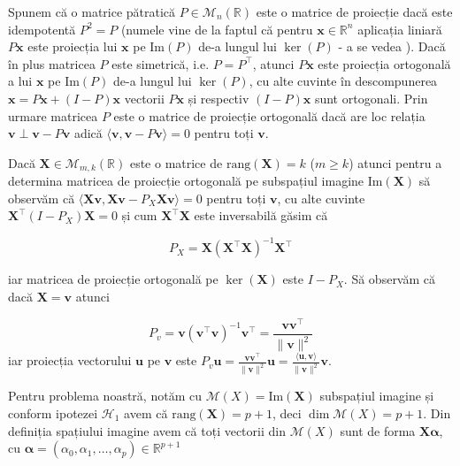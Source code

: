 \documentclass[]{article}
\begin{document}
Spunem că o matrice pătratică \(P\in\mathcal{M}_{n}(\mathbb{R})\) este o
matrice de proiecție dacă este idempotentă \(P^2 = P\) (numele vine de
la faptul că pentru \(\boldsymbol x\in\mathbb{R}^n\) aplicația liniară
\(P\boldsymbol x\) este proiecția lui \(\boldsymbol x\) pe
\(\mathrm{Im}(P)\) de-a lungul lui \(\ker(P)\) - a se vedea
\citep[Capitolul 1, Secțiunea 5.2]{Turtoi2000}). Dacă în plus matricea
\(P\) este simetrică, i.e. \(P = P^\intercal\), atunci
\(P\boldsymbol x\) este proiecția ortogonală a lui \(\boldsymbol x\) pe
\(\mathrm{Im}(P)\) de-a lungul lui \(\ker(P)\), cu alte cuvinte în
descompunerea \(\boldsymbol x = P\boldsymbol x + (I - P)\boldsymbol x\)
vectorii \(P\boldsymbol x\) și respectiv \((I - P)\boldsymbol x\) sunt
ortogonali. Prin urmare matricea \(P\) este o matrice de proiecție
ortogonală dacă are loc relația
\(\boldsymbol v\perp \boldsymbol v - P\boldsymbol v\) adică
\(\langle\boldsymbol v, \boldsymbol v - P\boldsymbol v\rangle = 0\)
pentru toți \(\boldsymbol v\).

Dacă \(\boldsymbol{X}\in\mathcal{M}_{m,k}(\mathbb{R})\) este o matrice
de \(\mathrm{rang}(\boldsymbol{X}) = k\) (\(m\geq k\)) atunci pentru a
determina matricea de proiecție ortogonală pe subspațiul imagine
\(\mathrm{Im}(\boldsymbol{X})\) să observăm că
\(\langle\boldsymbol{X}\boldsymbol v, \boldsymbol{X}\boldsymbol v - P_X\boldsymbol{X}\boldsymbol v\rangle = 0\)
pentru toți \(\boldsymbol{v}\), cu alte cuvinte
\(\boldsymbol{X}^\intercal(I - P_X)\boldsymbol{X} = 0\) și cum
\(\boldsymbol{X}^\intercal\boldsymbol{X}\) este inversabilă găsim că

\[
  P_{X} = \boldsymbol{X}\left(\boldsymbol{X}^\intercal\boldsymbol{X}\right)^{-1}\boldsymbol{X}^\intercal
\]

iar matricea de proiecție ortogonală pe \(\ker(\boldsymbol{X})\) este
\(I - P_{X}\). Să observăm că dacă \(\boldsymbol{X} = \boldsymbol{v}\)
atunci

\[
  P_v = \boldsymbol{v}\left(\boldsymbol{v}^\intercal\boldsymbol{v}\right)^{-1}\boldsymbol{v}^\intercal = \frac{\boldsymbol{v}\boldsymbol{v}^\intercal}{\lVert\boldsymbol{v}\rVert^2}
\] iar proiecția vectorului \(\boldsymbol{u}\) pe \(\boldsymbol{v}\)
este
\(P_v\boldsymbol{u} = \frac{\boldsymbol{v}\boldsymbol{v}^\intercal}{\lVert\boldsymbol{v}\rVert^2}\boldsymbol{u} = \frac{\langle\boldsymbol{u}, \boldsymbol{v}\rangle}{\lVert\boldsymbol{v}\rVert^2}\boldsymbol{v}\).

Pentru problema noastră, notăm cu
\(\mathcal{M}(X) = \mathrm{Im}(\boldsymbol{X})\) subspațiul imagine și
conform ipotezei \(\mathcal{H}_1\) avem că
\(\mathrm{rang}(\boldsymbol{X}) = p+1\), deci
\(\dim \mathcal{M}(X) = p+1\). Din definiția spațiului imagine avem că
toți vectorii din \(\mathcal{M}(X)\) sunt de forma
\(\boldsymbol X \boldsymbol\alpha\), cu
\(\boldsymbol \alpha = (\alpha_0, \alpha_1,\ldots, \alpha_p)\in\mathbb{R}^{p+1}\)
\end{document}
